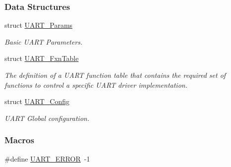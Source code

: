 \subsubsection*{Data Structures}
\begin{DoxyCompactItemize}
\item 
struct \hyperlink{struct_u_a_r_t___params}{U\-A\-R\-T\-\_\-\-Params}
\begin{DoxyCompactList}\small\item\em Basic U\-A\-R\-T Parameters. \end{DoxyCompactList}\item 
struct \hyperlink{struct_u_a_r_t___fxn_table}{U\-A\-R\-T\-\_\-\-Fxn\-Table}
\begin{DoxyCompactList}\small\item\em The definition of a U\-A\-R\-T function table that contains the required set of functions to control a specific U\-A\-R\-T driver implementation. \end{DoxyCompactList}\item 
struct \hyperlink{struct_u_a_r_t___config}{U\-A\-R\-T\-\_\-\-Config}
\begin{DoxyCompactList}\small\item\em U\-A\-R\-T Global configuration. \end{DoxyCompactList}\end{DoxyCompactItemize}
\subsubsection*{Macros}
\begin{DoxyCompactItemize}
\item 
\#define \hyperlink{_u_a_r_t_8h_a7e3562e7931cf51b41a32d8109072251}{U\-A\-R\-T\-\_\-\-E\-R\-R\-O\-R}~-\/1
\end{DoxyCompactItemize}
